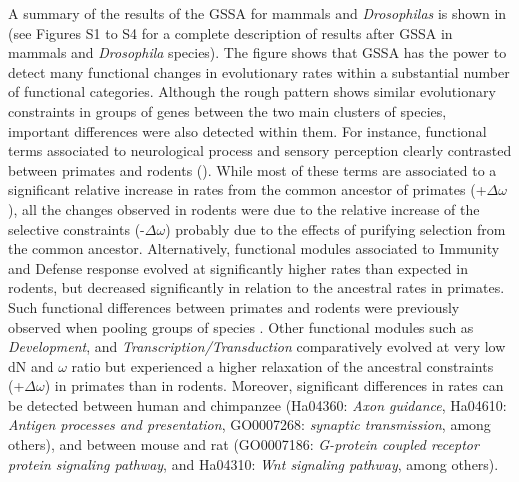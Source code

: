 A summary of the results of the GSSA for mammals and \textit{Drosophilas} is shown in  (see Figures S1 to S4 for a complete description of results after GSSA in mammals and \textit{Drosophila} species). The figure shows that GSSA has the power to detect many functional changes in evolutionary rates within a substantial number of functional categories. Although the rough pattern shows similar evolutionary constraints in groups of genes between the two main clusters of species, important differences were also detected within them. For instance, functional terms associated to neurological process and sensory perception clearly contrasted between primates and rodents (). While most of these terms are associated to a significant relative increase in rates from the common ancestor of primates (+$\Delta\omega$), all the changes observed in rodents were due to the relative increase of the selective constraints (-$\Delta\omega$) probably due to the effects of purifying selection from the common ancestor. Alternatively, functional modules associated to Immunity and Defense response evolved at significantly higher rates than expected in rodents, but decreased significantly in relation to the ancestral rates in primates. Such functional differences between primates and rodents were previously observed when pooling groups of species \cite{Kosiol2008a}. Other functional modules such as \textit{Development}, and \textit{Transcription/Transduction} comparatively evolved at very low dN and $\omega$ ratio but experienced a higher relaxation of the ancestral constraints (+$\Delta\omega$) in primates than in rodents. Moreover, significant differences in rates can be detected between human and chimpanzee (Ha04360: \textit{Axon guidance}, Ha04610: \textit{Antigen processes and presentation}, GO0007268: \textit{synaptic transmission}, among others), and between mouse and rat (GO0007186: \textit{G-protein coupled receptor protein signaling pathway}, and Ha04310: \textit{Wnt signaling pathway}, among others).


